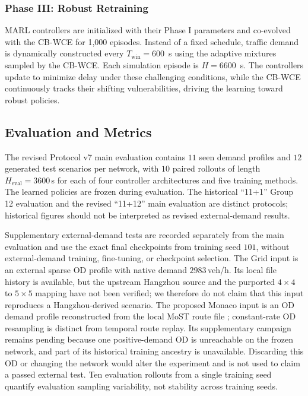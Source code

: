\documentclass[lettersize,journal]{IEEEtran}
\begin{document}
\subsubsection{Phase III: Robust Retraining}
MARL controllers are initialized with their Phase I parameters and co-evolved with the CB-WCE for 1,000 episodes. Instead of a fixed schedule, traffic demand is dynamically constructed every $T_{\mathrm{win}} = 600$~s using the adaptive mixtures sampled by the CB-WCE. Each simulation episode is $H = 6600$~s. The controllers update to minimize delay under these challenging conditions, while the CB-WCE continuously tracks their shifting vulnerabilities, driving the learning toward robust policies.


\subsection{Evaluation and Metrics}
\label{subsec:training_evaluation}

The revised Protocol v7 main evaluation contains $11$ seen demand profiles and $12$ generated test scenarios per network, with $10$ paired rollouts of length $H_{\mathrm{eval}} = 3600$\,s for each of four controller architectures and five training methods. The learned policies are frozen during evaluation. The historical ``11+1'' Group 12 evaluation and the revised ``11+12'' main evaluation are distinct protocols; historical figures should not be interpreted as revised external-demand results.

Supplementary external-demand tests are recorded separately from the main evaluation and use the exact final checkpoints from training seed $101$, without external-demand training, fine-tuning, or checkpoint selection. The Grid input is an external sparse OD profile with native demand $2983$\,veh/h. Its local file history is available, but the upstream Hangzhou source and the purported $4\times4$ to $5\times5$ mapping have not been verified; we therefore do not claim that this input reproduces a Hangzhou-derived scenario. The proposed Monaco input is an OD demand profile reconstructed from the local MoST route file \cite{codeca2018monaco}; constant-rate OD resampling is distinct from temporal route replay. Its supplementary campaign remains pending because one positive-demand OD is unreachable on the frozen network, and part of its historical training ancestry is unavailable. Discarding this OD or changing the network would alter the experiment and is not used to claim a passed external test. Ten evaluation rollouts from a single training seed quantify evaluation sampling variability, not stability across training seeds.
\end{document}
